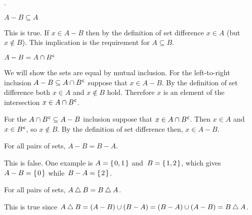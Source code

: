 \documentclass{ibl}  %
\begin{document}
\begin{problem} \pord.
\begin{exes}
\begin{exercise} 
  $A-B\subseteq A$
\end{exercise}
\begin{answer}
  This is true.
  If $x\in A-B$
  then by the definition of set difference $x\in A$ (but $x\notin B$).
  This implication is the requirement for $A\subseteq B$.  
\end{answer}
\begin{exercise}[\midlength] 
  $A-B=A\cap{B}^{\mspace{1mu}\mathsf{c}}$
\end{exercise}
\begin{answer}
  We will show the sets are equal by mutual inclusion.
  For the left-to-right inclusion $A-B\subseteq A\cap {B}^{\mspace{1mu}\mathsf{c}}$
  suppose that $x\in A-B$.
  By the definition of set difference both $x\in A$ and $x\notin B$ hold.
  Therefore $x$ is an element of the intersection 
  $x\in A\cap{B}^{\mspace{1mu}\mathsf{c}}$.
  
  For the $A\cap{B}^{\mspace{1mu}\mathsf{c}}\subseteq A-B$ inclusion suppose that
  $x\in A\cap{B}^{\mspace{1mu}\mathsf{c}}$.
  Then $x\in A$ and $x\in{B}^{\mspace{1mu}\mathsf{c}}$, so $x\notin B$.
  By the definition of set difference then, $x\in A-B$.  
\end{answer}
\begin{exercise}[\midlength] 
  For all pairs of sets, $A-B=B-A$.
\end{exercise}
\begin{answer}
  This is false.
  One example is $A=\mbox{$\{\hspace{0.1em}0,1\hspace{0.1em}\}$}$ and~$B=\mbox{$\{\hspace{0.1em}1,2\hspace{0.1em}\}$}$, which gives
  $A-B=\mbox{$\{\hspace{0.1em}0\hspace{0.1em}\}$}$ while~$B-A=\mbox{$\{\hspace{0.1em}2\hspace{0.1em}\}$}$.  
\end{answer}
\begin{exercise} 
  For all pairs of sets, $A\mathbin{\triangle} B=B\mathbin{\triangle} A$.
\end{exercise}
\begin{answer}
  This is true since
  $A\mathbin{\triangle} B=(A-B)\cup(B-A)=(B-A)\cup(A-B)=B\mathbin{\triangle} A$.
\end{answer}
\end{exes}
\end{problem}
\end{document}
